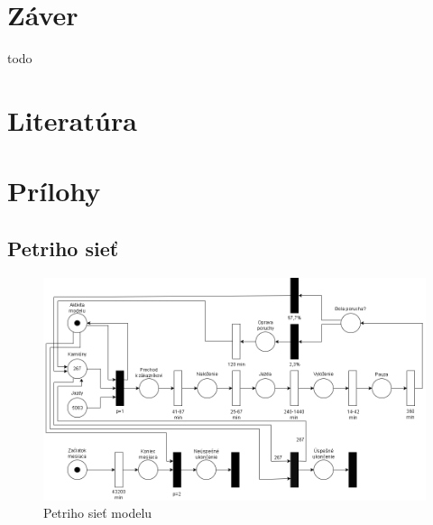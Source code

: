 \documentclass[a4paper, 11pt]{article}
\begin{document}
    \newpage
	\section{Záver}
	todo 

    \newpage
	\section{Literatúra}
	
    \renewcommand{\refname}{}
	

    \newpage
	\section{Prílohy}
    \subsection{Petriho sieť}
	\label{subsection:petri_net}
	\begin{figure}[!ht]
		\centering
		\vspace{1cm}
		\includegraphics[width=0.95\linewidth]{resources/petri_net.png}
		\caption{Petriho sieť modelu}
		\label{figure:petri_net}
	\end{figure}
\end{document}
